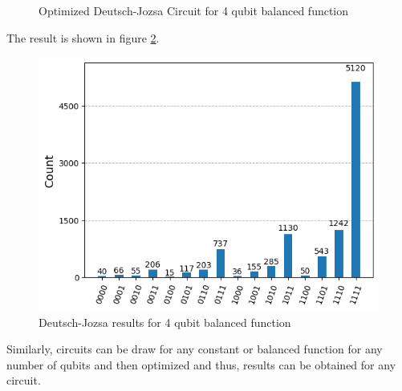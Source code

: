 \documentclass[12pt, oneside]{book}
\theoremstyle{definition}
\theoremstyle{definition}
\theoremstyle{remark}
\begin{document}
\begin{enumerate}
\begin{figure}[H]
        \caption{Optimized Deutsch-Jozsa Circuit for 4 qubit balanced function}
        \label{fig:opt_deutsch_jozsa_4q}
    \end{figure}
    The result is shown in figure \ref{fig:deutsch_jozsa_4q_result}.
    \begin{figure}
        \centering
        \includegraphics[width=0.75\linewidth]{../images/deutsch_jozsa_4q_result.png}
        \caption{Deutsch-Jozsa results for 4 qubit balanced function}
        \label{fig:deutsch_jozsa_4q_result}
    \end{figure}

    Similarly, circuits can be draw for any constant or balanced function for any number of qubits and then optimized and thus, results can be obtained for any circuit.


\end{enumerate}
\end{document}
